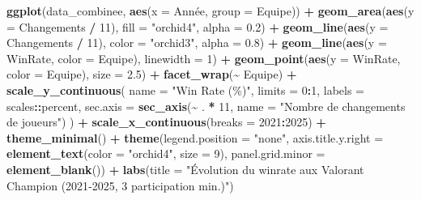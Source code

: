 \documentclass[
]{article}
\newenvironment{Shaded}{\begin{snugshade}}{\end{snugshade}}
\newcommand{\AttributeTok}[1]{\textcolor[rgb]{0.13,0.29,0.53}{#1}}
\newcommand{\DecValTok}[1]{\textcolor[rgb]{0.00,0.00,0.81}{#1}}
\newcommand{\FloatTok}[1]{\textcolor[rgb]{0.00,0.00,0.81}{#1}}
\newcommand{\FunctionTok}[1]{\textcolor[rgb]{0.13,0.29,0.53}{\textbf{#1}}}
\newcommand{\NormalTok}[1]{#1}
\newcommand{\SpecialCharTok}[1]{\textcolor[rgb]{0.81,0.36,0.00}{\textbf{#1}}}
\newcommand{\StringTok}[1]{\textcolor[rgb]{0.31,0.60,0.02}{#1}}
\begin{document}
\begin{Shaded}
\begin{Highlighting}[]
\FunctionTok{ggplot}\NormalTok{(data\_combinee, }\FunctionTok{aes}\NormalTok{(}\AttributeTok{x =}\NormalTok{ Année, }\AttributeTok{group =}\NormalTok{ Equipe)) }\SpecialCharTok{+}
  \FunctionTok{geom\_area}\NormalTok{(}\FunctionTok{aes}\NormalTok{(}\AttributeTok{y =}\NormalTok{ Changements }\SpecialCharTok{/} \DecValTok{11}\NormalTok{), }\AttributeTok{fill =} \StringTok{"orchid4"}\NormalTok{, }\AttributeTok{alpha =} \FloatTok{0.2}\NormalTok{) }\SpecialCharTok{+} 
  \FunctionTok{geom\_line}\NormalTok{(}\FunctionTok{aes}\NormalTok{(}\AttributeTok{y =}\NormalTok{ Changements }\SpecialCharTok{/} \DecValTok{11}\NormalTok{), }\AttributeTok{color =} \StringTok{"orchid3"}\NormalTok{, }\AttributeTok{alpha =} \FloatTok{0.8}\NormalTok{) }\SpecialCharTok{+}
  \FunctionTok{geom\_line}\NormalTok{(}\FunctionTok{aes}\NormalTok{(}\AttributeTok{y =}\NormalTok{ WinRate, }\AttributeTok{color =}\NormalTok{ Equipe), }\AttributeTok{linewidth =} \DecValTok{1}\NormalTok{) }\SpecialCharTok{+}
  \FunctionTok{geom\_point}\NormalTok{(}\FunctionTok{aes}\NormalTok{(}\AttributeTok{y =}\NormalTok{ WinRate, }\AttributeTok{color =}\NormalTok{ Equipe), }\AttributeTok{size =} \FloatTok{2.5}\NormalTok{) }\SpecialCharTok{+}
  \FunctionTok{facet\_wrap}\NormalTok{(}\SpecialCharTok{\textasciitilde{}}\NormalTok{ Equipe) }\SpecialCharTok{+}
  \FunctionTok{scale\_y\_continuous}\NormalTok{(}
    \AttributeTok{name =} \StringTok{"Win Rate (\%)"}\NormalTok{,}
    \AttributeTok{limits =} \DecValTok{0}\SpecialCharTok{:}\DecValTok{1}\NormalTok{, }\AttributeTok{labels =}\NormalTok{ scales}\SpecialCharTok{::}\NormalTok{percent,}
    \AttributeTok{sec.axis =} \FunctionTok{sec\_axis}\NormalTok{(}\SpecialCharTok{\textasciitilde{}}\NormalTok{ . }\SpecialCharTok{*} \DecValTok{11}\NormalTok{, }\AttributeTok{name =} \StringTok{"Nombre de changements de joueurs"}\NormalTok{)}
\NormalTok{  ) }\SpecialCharTok{+}
  \FunctionTok{scale\_x\_continuous}\NormalTok{(}\AttributeTok{breaks =} \DecValTok{2021}\SpecialCharTok{:}\DecValTok{2025}\NormalTok{) }\SpecialCharTok{+}
  \FunctionTok{theme\_minimal}\NormalTok{() }\SpecialCharTok{+}
  \FunctionTok{theme}\NormalTok{(}\AttributeTok{legend.position =} \StringTok{"none"}\NormalTok{, }
        \AttributeTok{axis.title.y.right =} \FunctionTok{element\_text}\NormalTok{(}\AttributeTok{color =} \StringTok{"orchid4"}\NormalTok{, }\AttributeTok{size =} \DecValTok{9}\NormalTok{),}
        \AttributeTok{panel.grid.minor =} \FunctionTok{element\_blank}\NormalTok{()) }\SpecialCharTok{+}
  \FunctionTok{labs}\NormalTok{(}\AttributeTok{title =} \StringTok{"Évolution du winrate aux Valorant Champion (2021{-}2025, 3 participation min.)"}\NormalTok{)}
\end{Highlighting}
\end{Shaded}
\end{document}
